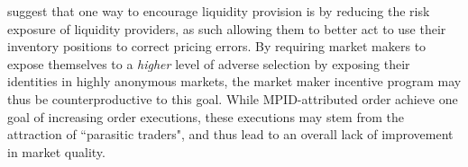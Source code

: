 \documentclass{article}
\begin{document}

\citet{Hendershott2014405} suggest that one way to encourage liquidity provision is by reducing the risk exposure of liquidity providers, as such allowing them to better act to use their inventory positions to correct pricing errors. By requiring market makers to expose themselves to a \emph{higher} level of adverse selection by exposing their identities in highly anonymous markets, the market maker incentive program may thus be counterproductive to this goal. While MPID-attributed order achieve one goal of increasing order executions, these executions may stem from the attraction of ``parasitic traders", and thus lead to an overall lack of improvement in market quality. 




\clearpage
\end{document}
